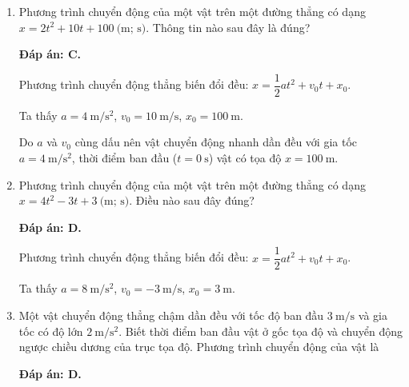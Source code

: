 \begin{enumerate}[label=\bfseries Câu \arabic*:]
	\item {}
	
	{ Phương trình chuyển động của một vật trên một đường thẳng có dạng $x=2t^2 + 10t+100\ \text{(m; s)}$. Thông tin nào sau đây là đúng?
	}
	\hideall
	{	\textbf{Đáp án: C.}
		
		Phương trình chuyển động thẳng biến đổi đều: $x=\dfrac{1}{2}at^2+v_0t+x_0$.
		
		Ta thấy $a=\SI{4}{\meter / \second \squared}$, $v_0=\SI{10}{\meter / \second}$, $x_0=\SI{100}{\meter}$.
		
		Do $a$ và $v_0$ cùng dấu nên vật chuyển động nhanh dần đều với gia tốc $a=\SI{4}{\meter / \second \squared}$, thời điểm ban đầu ($t=\SI{0}{\second}$) vật có tọa độ $x=\SI{100}{\meter}$.
	}
	\item {}
	
	{Phương trình chuyển động của một vật trên một đường thẳng có dạng $x=4t^2-3t+3\ \text{(m; s)}$. Điều nào sau đây đúng?
	}
	\hideall
	{	\textbf{Đáp án: D.}
		
		Phương trình chuyển động thẳng biến đổi đều: $x=\dfrac{1}{2}at^2+v_0t+x_0$.
		
		Ta thấy $a=\SI{8}{\meter / \second \squared}$, $v_0=\SI{-3}{\meter / \second}$, $x_0=\SI{3}{\meter}$.
	}
	\item {}
	
	{Một vật chuyển động thẳng chậm dần đều với tốc độ ban đầu $\SI{3}{\meter/\second}$ và gia tốc có độ lớn $\SI{2}{\meter/\second^2}$. Biết thời điểm ban đầu vật ở gốc tọa độ và chuyển động ngược chiều dương của trục tọa độ. Phương trình chuyển động của vật là
	}
	\hideall
	{	\textbf{Đáp án: D.}
		
}
\end{enumerate}
